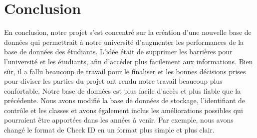 \documentclass[utf8]{article}
\begin{document}
\section{Conclusion }
\par
En conclusion, notre projet s'est concentré sur la création d'une nouvelle base de données qui permettrait à notre université d'augmenter les performances de la base de données des étudiants. L'idée était de supprimer les barrières pour l'université et les étudiants, afin d'accéder plus facilement aux informations. Bien sûr, il a fallu beaucoup de travail pour le finaliser et les bonnes décisions prises pour diviser les parties du projet ont rendu notre travail beaucoup plus confortable. Notre base de données est plus facile d'accès et plus fiable que la précédente. Nous avons modifié la base de données de stockage, l'identifiant de contrôle et les classes et avons également inclus les améliorations possibles qui pourraient être apportées dans les années à venir. Par exemple, nous avons changé le format de Check ID en un format plus simple et plus clair.
\par
\end{document}
